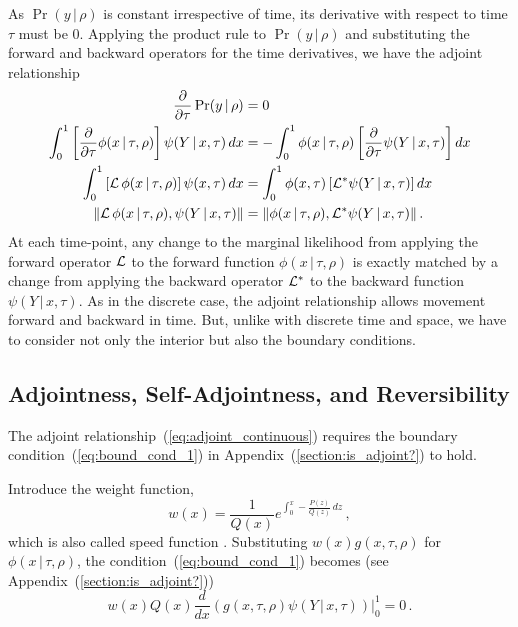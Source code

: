\documentclass[preprint]{elsarticle}
\newcommand\given{{\,|\,}}
\newcommand{\norm}[1]{\left\lVert#1\right\rVert}
\newcommand\eg{{\it e.g.,}}
\newcommand\y{\ensuremath{Y}}
\begin{document}
As $\Pr(y\given\rho)$ is constant irrespective of time, its derivative with respect to time $\tau$ must be $0$. Applying the product rule to $\Pr(y\given\rho)$ and substituting the forward and backward operators for the time derivatives, we have the adjoint relationship
\begin{equation}\label{eq:adjoint_continuous}
\begin{split}
 \frac{\partial}{\partial\tau} \Pr(y\given \rho) &= 0\\
\int_{0}^{1} \left[\frac{\partial}{\partial\tau} \phi(x\given\tau,\rho)\right] \psi(\y\given x,\tau)\,dx &= -\int_{0}^{1} \phi(x\given\tau,\rho) \left[\frac{\partial}{\partial\tau} \psi(\y\given x,\tau)\right] dx\\
\int_{0}^{1} \left[{\cal L}\,\phi(x\given\tau,\rho)\right] \psi(x,\tau)\,dx &= \int_{0}^{1}  \phi(x,\tau) \left[{\cal L}^{*} \psi(\y\given x,\tau)\right] dx\\
\norm{{\cal L}\,\phi(x\given\tau,\rho), \psi(\y\given x,\tau)} &= \norm{ \phi(x\given\tau,\rho),{\cal L}^{*} \psi(\y\given x,\tau)}.
\end{split}
\end{equation}
 At each time-point, any change to the marginal likelihood from applying the forward operator ${\cal L}$ to the forward function $\phi(x\given\tau,\rho)$ is exactly matched by a change from applying the backward operator ${\cal L}^{*}$ to the backward function $\psi(\y\given x,\tau)$. As in the discrete case, the adjoint relationship allows movement forward and backward in time. But, unlike with discrete time and space, we have to consider not only the interior but also the boundary conditions. 

\subsection{Adjointness, Self-Adjointness, and Reversibility}

The adjoint relationship~(\ref{eq:adjoint_continuous}) requires the boundary condition~(\ref{eq:bound_cond_1}) in Appendix~(\ref{section:is_adjoint?}) to hold. 

Introduce the weight function, 
\begin{equation}\label{eq:weight_function}
    w(x)=\frac1{Q(x)}e^{\int_0^x -\frac{P(z)}{Q(z)}\,dz}\,,
\end{equation}
which is also called speed function \citep[\eg][]{Ewen04,Song12}. Substituting  $w(x)g(x,\tau,\rho)$ for $\phi(x\given\tau,\rho)$, the condition~(\ref{eq:bound_cond_1}) becomes (see Appendix~(\ref{section:is_adjoint?}))
\begin{equation}\label{eq:bound_cond}
w(x)Q(x)\frac{d}{d x}\left(g(x,\tau,\rho)\psi(\y\given x,\tau)\right)\big|_0^1=0\,.
\end{equation}
\end{document}
